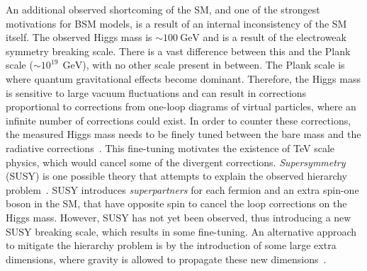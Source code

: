 An additional observed shortcoming of the SM, and one of the strongest motivations for BSM models, is a result of an internal inconsistency of the SM itself. The observed Higgs mass is $\sim \SI{100}{\giga\electronvolt}$ and is a result of the electroweak symmetry breaking scale. There is a vast difference between this and the Plank scale ($\sim 10^{19}~\SI{}{\giga\electronvolt}$), with no other scale present in between. The Plank scale is where quantum gravitational effects become dominant. Therefore, the Higgs mass is sensitive to large vacuum fluctuations and can result in corrections proportional to corrections from one-loop diagrams of virtual particles, where an infinite number of corrections could exist. In order to counter these corrections, the measured Higgs mass needs to be finely tuned between the bare mass and the radiative corrections~\cite{Giudice_2008}. This fine-tuning motivates the existence of TeV scale physics, which would cancel some of the divergent corrections. \emph{Supersymmetry} (SUSY) is one possible theory that attempts to explain the observed hierarchy problem~\cite{MARTIN_1998}. SUSY introduces \emph{superpartners} for each fermion and an extra spin-one boson in the SM, that have opposite spin to cancel the loop corrections on the Higgs mass. However, SUSY has not yet been observed, thus introducing a new SUSY breaking scale, which results in some fine-tuning. An alternative approach to mitigate the hierarchy problem is by the introduction of some large extra dimensions, where gravity is allowed to propagate these new dimensions~\cite{Arkani_Hamed_1998}. 


